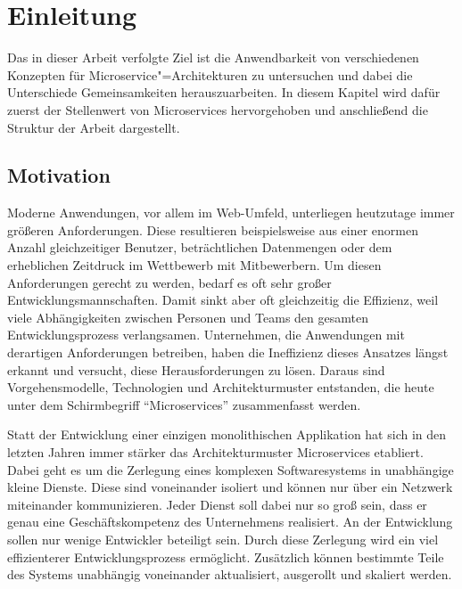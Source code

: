 \chapter{Einleitung}

Das in dieser Arbeit verfolgte Ziel ist die Anwendbarkeit von verschiedenen Konzepten für Microservice"=Architekturen zu untersuchen und dabei die Unterschiede \bzw Gemeinsamkeiten herauszuarbeiten. In diesem Kapitel wird dafür zuerst der Stellenwert von Microservices hervorgehoben und anschließend die Struktur der Arbeit dargestellt.

\section{Motivation}

Moderne Anwendungen, vor allem im Web-Umfeld, unterliegen heutzutage immer größeren Anforderungen. Diese resultieren beispielsweise aus einer enormen Anzahl gleichzeitiger Benutzer, beträchtlichen Datenmengen oder dem erheblichen Zeitdruck im Wettbewerb mit Mitbewerbern. Um diesen Anforderungen gerecht zu werden, bedarf es oft sehr großer Entwicklungsmannschaften. Damit sinkt aber oft gleichzeitig die Effizienz, weil viele Abhängigkeiten zwischen Personen und Teams den gesamten Entwicklungsprozess verlangsamen. Unternehmen, die Anwendungen mit derartigen Anforderungen betreiben, haben die Ineffizienz dieses Ansatzes längst erkannt und versucht, diese Herausforderungen zu lösen. Daraus sind Vorgehensmodelle, Technologien und Architekturmuster entstanden, die heute unter dem Schirmbegriff "`Microservices"' zusammenfasst werden.

Statt der Entwicklung einer einzigen monolithischen Applikation hat sich in den letzten Jahren immer stärker das Architekturmuster Microservices etabliert. Dabei geht es um die Zerlegung eines komplexen Softwaresystems in unabhängige kleine Dienste. Diese sind voneinander isoliert und können nur über ein Netzwerk miteinander kommunizieren. Jeder Dienst soll dabei nur so groß sein, dass er genau eine Geschäftskompetenz des Unternehmens realisiert. An der Entwicklung sollen nur wenige Entwickler beteiligt sein. Durch diese Zerlegung wird ein viel effizienterer Entwicklungsprozess ermöglicht. Zusätzlich können bestimmte Teile des Systems unabhängig voneinander aktualisiert, ausgerollt und skaliert werden.

